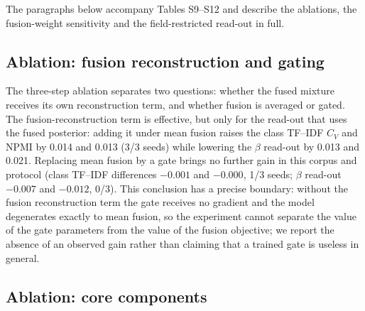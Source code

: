 \documentclass[11pt]{article}
\begin{document}
The paragraphs below accompany Tables S9--S12 and describe the ablations,
the fusion-weight sensitivity and the field-restricted read-out in full.

\subsection{Ablation: fusion reconstruction and gating}



The three-step ablation separates two questions: whether the fused mixture receives its own
reconstruction term, and whether fusion is averaged or gated. The fusion-reconstruction term is
effective, but only for the read-out that uses the fused posterior: adding it under mean fusion
raises the class TF--IDF $C_V$ and NPMI by 0.014 and 0.013 (3/3 seeds) while lowering the $\beta$
read-out by 0.013 and 0.021. Replacing mean fusion by a gate brings no further gain in this corpus
and protocol (class TF--IDF differences $-0.001$ and $-0.000$, 1/3 seeds; $\beta$ read-out
$-0.007$ and $-0.012$, 0/3). This conclusion has a precise boundary: without the fusion
reconstruction term the gate receives no gradient and the model degenerates exactly to mean fusion,
so the experiment cannot separate the value of the gate parameters from the value of the fusion
objective; we report the absence of an observed gain rather than claiming that a trained gate is
useless in general.

\subsection{Ablation: core components}
\end{document}
